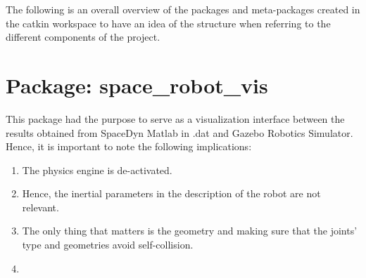 \documentclass[11pt, twoside, a4paper]{report}
\begin{document}
	The following is an overall overview of the packages and meta-packages created in the catkin workspace to have an idea of the structure when referring to the different components of the project.  
	
	\vspace{30mm}
	

\section{Package: space\_robot\_vis }

This package had the purpose to serve as a visualization interface between the results obtained from SpaceDyn Matlab in .dat and Gazebo Robotics Simulator.
Hence, it is important to note the following implications:
	
	\begin{enumerate}
		\item The physics engine is de-activated.
		\item Hence, the inertial parameters in the description of the robot are not relevant. 
		\item The only thing that matters is the geometry and making sure that the joints' type and geometries avoid self-collision.  
		\item 
	\end{enumerate}

%
%
%
%
%
%
%
%
%
%
%
%
\end{document}
